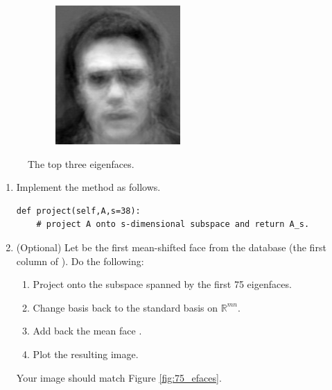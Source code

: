 \begin{figure}
\begin{subfigure}[b]{0.3\textwidth}
\end{subfigure}
\begin{subfigure}[b]{0.3\textwidth}
\includegraphics[width=\textwidth]{eigenface2.png}
\end{subfigure}
\caption{The top three eigenfaces.}
\label{facialRecognition:eigenfaces}
\end{figure}



\begin{problem}
\label{prob:top_n}
\leavevmode
\begin{enumerate}
\item Implement the method   as follows.
\begin{lstlisting}
def project(self,A,s=38):
    # project A onto s-dimensional subspace and return A_s.
\end{lstlisting}
\item (Optional) Let  be the first mean-shifted face from the database (the first column of ). Do the following:
\begin{enumerate}
\item Project  onto the subspace spanned by the first 75 eigenfaces.
\item Change basis back to the standard basis on $\mathbb{R}^{mn}$.
\item Add back the mean face .
\item Plot the resulting image.
\end{enumerate}
Your image should match Figure \ref{fig:75_efaces}.
\end{enumerate}
\end{problem}


